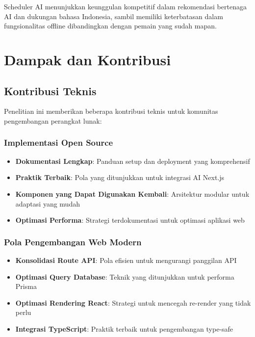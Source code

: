 Scheduler AI menunjukkan keunggulan kompetitif dalam rekomendasi bertenaga AI dan dukungan bahasa Indonesia, sambil memiliki keterbatasan dalam fungsionalitas offline dibandingkan dengan pemain yang sudah mapan.

\section{Dampak dan Kontribusi}

\subsection{Kontribusi Teknis}

Penelitian ini memberikan beberapa kontribusi teknis untuk komunitas pengembangan perangkat lunak:

\subsubsection{Implementasi Open Source}

\begin{itemize}
\item \textbf{Dokumentasi Lengkap}: Panduan setup dan deployment yang komprehensif
\item \textbf{Praktik Terbaik}: Pola yang ditunjukkan untuk integrasi AI Next.js
\item \textbf{Komponen yang Dapat Digunakan Kembali}: Arsitektur modular untuk adaptasi yang mudah
\item \textbf{Optimasi Performa}: Strategi terdokumentasi untuk optimasi aplikasi web
\end{itemize}

\subsubsection{Pola Pengembangan Web Modern}

\begin{itemize}
\item \textbf{Konsolidasi Route API}: Pola efisien untuk mengurangi panggilan API
\item \textbf{Optimasi Query Database}: Teknik yang ditunjukkan untuk performa Prisma
\item \textbf{Optimasi Rendering React}: Strategi untuk mencegah re-render yang tidak perlu
\item \textbf{Integrasi TypeScript}: Praktik terbaik untuk pengembangan type-safe
\end{itemize}

